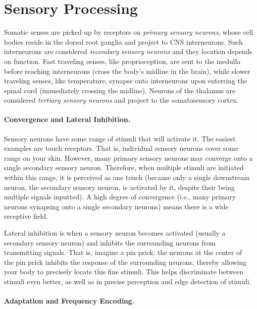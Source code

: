 \chapter{Sensory Processing}

Somatic senses are picked up by receptors on \textit{primary sensory neurons}, whose cell bodies reside in the dorsal root ganglia and project to CNS interneurons. Such interneurons are considered \textit{secondary sensory neurons} and they location depends on function. Fast traveling senses, like proprioception, are sent to the medulla before reaching interneurons (cross the body's midline in the brain), while slower traveling senses, like temperature, synapse onto interneurons upon enterring the spinal cord (immediately crossing the midline). Neurons of the thalamus are considered \textit{tertiary sensory neurons} and project to the somatosensory cortex. 

\subsubsection{Convergence and Lateral Inhibition.}

Sensory neurons have some range of stimuli that will activate it. The easiest examples are touch receptors. That is, individual sensory neurons cover some range on your skin. However, many primary sensory neurons may converge onto a single secondary sensory neuron. Therefore, when multiple stimuli are initiated within this range, it is perceived as one touch (because only a single downstream neuron, the secondary sensory neuron, is activated by it, despite their being multiple signals inputted). A high degree of convergence (i.e., many primary neurons synapsing onto a single secondary neurons) means there is a wide receptive field.\newline

Lateral inhibition is when a sensory neuron becomes activated (usually a secondary sensory neuron) and inhibits the surrounding neurons from transmitting signals. That is, imagine a pin prick: the neurons at the center of the pin prick inhibits the response of the surrounding neurons, thereby allowing your body to precisely locate this fine stimuli. This helps discriminate between stimuli even better, as well as in precise perception and edge detection of stimuli.\newline

\subsubsection{Adaptation and Frequency Encoding.}

